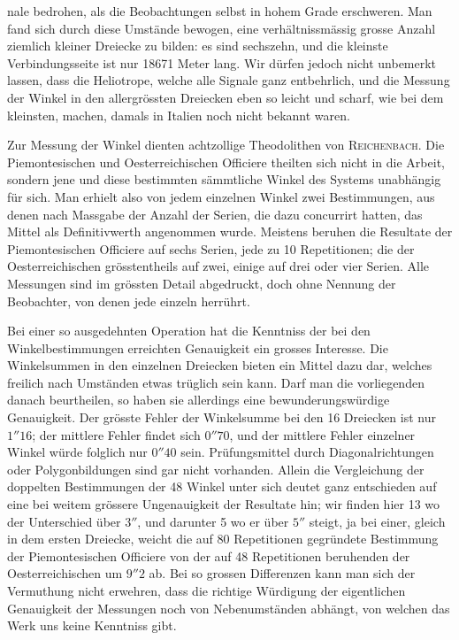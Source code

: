 %
nale bedrohen, als die Beobachtungen selbst in hohem Grade erschweren. Man fand sich durch diese Umstände bewogen, eine verhältnissmässig grosse Anzahl ziemlich kleiner Dreiecke zu bilden: es sind sechszehn, und die kleinste Verbindungsseite ist nur 18671 Meter lang. Wir dürfen jedoch nicht unbemerkt lassen, dass die Heliotrope, welche alle Signale ganz entbehrlich, und die Messung der Winkel in den allergrössten Dreiecken eben so leicht und scharf, wie bei dem kleinsten, machen, damals in Italien noch nicht bekannt waren.

Zur Messung der Winkel dienten achtzollige Theodolithen von \textsc{Reichenbach}. Die Piemontesischen und Oesterreichischen Officiere theilten sich nicht in die Arbeit, sondern jene und diese bestimmten sämmtliche Winkel des Systems unabhängig für sich. Man erhielt also von jedem einzelnen Winkel zwei Bestimmungen, aus denen nach Massgabe der Anzahl der Serien, die dazu concurrirt hatten, das Mittel als Definitivwerth angenommen wurde. Meistens beruhen die Resultate der Piemontesischen Officiere auf sechs Serien, jede zu 10 Repetitionen; die der Oesterreichischen grösstentheils auf zwei, einige auf drei oder vier Serien. Alle Messungen sind im grössten Detail abgedruckt, doch ohne Nennung der Beobachter, von denen jede einzeln herrührt.

Bei einer so ausgedehnten Operation hat die Kenntniss der bei den Winkelbestimmungen erreichten Genauigkeit ein grosses Interesse. Die Winkelsummen in den einzelnen Dreiecken bieten ein Mittel dazu dar, welches freilich nach Umständen etwas trüglich sein kann. Darf man die vorliegenden danach beurtheilen, so haben sie allerdings eine bewunderungswürdige Genauigkeit. Der grösste Fehler der Winkelsumme bei den 16 Dreiecken ist nur \(1''16\); der mittlere Fehler findet sich \(0''70\), und der mittlere Fehler einzelner Winkel würde folglich nur \(0''40\) sein. Prüfungsmittel durch Diagonalrichtungen oder Polygonbildungen sind gar nicht vorhanden. Allein die Vergleichung der doppelten Bestimmungen der 48 Winkel unter sich deutet ganz entschieden auf eine bei weitem grössere Ungenauigkeit der Resultate hin; wir finden hier 13 wo der Unterschied über \(3''\), und darunter 5 wo er über \(5''\) steigt, ja bei einer, gleich in dem ersten Dreiecke, weicht die auf 80 Repetitionen gegründete Bestimmung der Piemontesischen Officiere von der auf 48 Repetitionen beruhenden der Oesterreichischen um \(9''2\) ab. Bei so grossen Differenzen kann man sich der Vermuthung nicht erwehren, dass die richtige Würdigung der eigentlichen Genauigkeit der Messungen noch von Nebenumständen abhängt, von welchen das Werk uns keine Kenntniss gibt.
